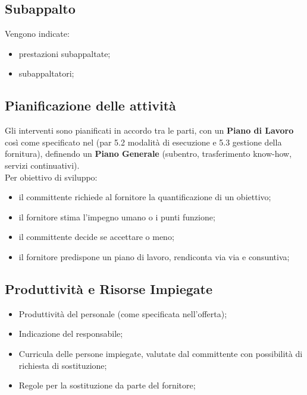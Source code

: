 \documentclass{article}
\begin{document}
\subsection{Subappalto}\label{sub:subappalto} %
Vengono indicate:
\begin{itemize}
    \item prestazioni subappaltate;
    \item subappaltatori;
\end{itemize}
%
\subsection{Pianificazione delle attività}\label{sub:pianificazione_delle_attivit} %
Gli interventi sono pianificati in accordo tra le parti, con un \textbf{Piano di Lavoro} così come specificato nel  (par 5.2 modalità di esecuzione e 5.3 gestione della fornitura), definendo un \textbf{Piano Generale} (subentro, trasferimento know-how, servizi continuativi).
\\
Per obiettivo di sviluppo:
\begin{itemize}
    \item il committente richiede al fornitore la quantificazione di un obiettivo;
    \item il fornitore stima l'impegno umano o i punti funzione;
    \item il committente decide se accettare o meno;
    \item il fornitore predispone un piano di lavoro, rendiconta via via e consuntiva;
\end{itemize}
%
\subsection{Produttività e Risorse Impiegate}\label{sub:produttivit_e_risorse_impiegate} %
\begin{itemize}
    \item Produttività del personale (come specificata nell'offerta);
    \item Indicazione del responsabile;
    \item Curricula delle persone impiegate, valutate dal committente con possibilità di richiesta di sostituzione;
    \item Regole per la sostituzione da parte del fornitore;
\end{itemize}
%
\end{document}
